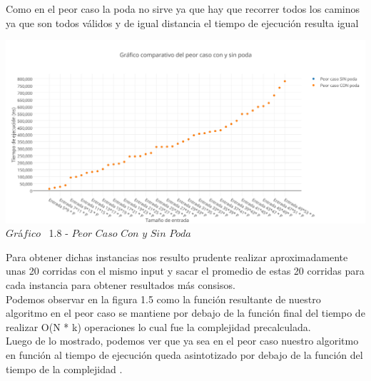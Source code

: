 Como en el peor caso la poda no sirve ya que hay que recorrer todos los caminos ya que son todos v\'alidos y de igual distancia el tiempo de ejecuci\'on resulta igual

\vspace*{0.3cm} \vspace*{0.3cm}
  \begin{center}
 \includegraphics[scale=0.65]{./EJ1/peorcaso1.png}
 {$Gr$\'a$fico$ \ 1.8 - $Peor$ $Caso$ $Con$ $y$ $Sin$ $Poda$}
  \end{center}
   \vspace*{0.3cm}
  
 Para obtener dichas instancias nos resulto prudente realizar aproximadamente unas 20 corridas con el mismo input y sacar el promedio de estas 20 corridas para cada instancia para obtener resultados m\'as consisos.\\ 

Podemos observar en la figura 1.5 como la funci\'on resultante de nuestro algoritmo en el peor caso se mantiene por debajo de la funci\'on final del tiempo de realizar O(N * k) operaciones lo cual fue la complejidad precalculada.\\

Luego de lo mostrado, podemos ver que ya sea en el peor caso nuestro algoritmo en funci\'on al tiempo de ejecuci\'on queda asintotizado por debajo de la funci\'on del tiempo de la complejidad .
